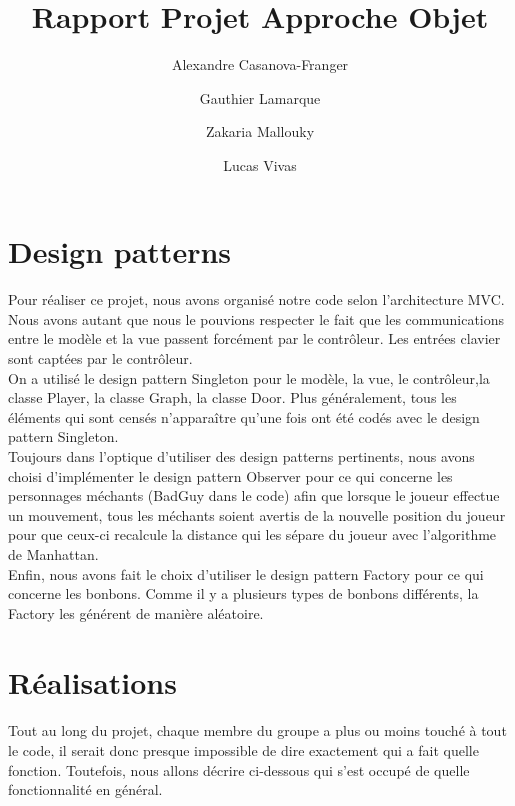 \documentclass{article}
\title{Rapport Projet Approche Objet}
\author{Alexandre Casanova-Franger\\
        \and
        Gauthier Lamarque\\
        \and
        Zakaria Mallouky\\
        \and
        Lucas Vivas\\
        }
\begin{document}
  \maketitle
  \section{Design patterns}
  \paragraph{}
  Pour réaliser ce projet, nous avons organisé notre code selon l'architecture
  MVC. Nous avons autant que nous le pouvions respecter le fait que les
  communications entre le modèle et la vue passent forcément par le contrôleur.
  Les entrées clavier sont captées par le contrôleur.\\
  On a utilisé le design pattern Singleton pour le modèle, la vue, le
  contrôleur,la classe Player, la classe Graph, la classe Door. Plus
  généralement, tous les éléments qui sont censés n'apparaître qu'une fois ont
  été codés avec le design pattern Singleton.\\
  Toujours dans l'optique d'utiliser des design patterns pertinents, nous avons
  choisi d'implémenter le design pattern Observer pour ce qui concerne les
  personnages méchants (BadGuy dans le code) afin que lorsque le joueur effectue
  un mouvement, tous les méchants soient avertis de la nouvelle position du
  joueur pour que ceux-ci recalcule la distance qui les sépare du joueur avec
  l'algorithme de Manhattan.\\
  Enfin, nous avons fait le choix d'utiliser le design pattern Factory pour ce
  qui concerne les bonbons. Comme il y a plusieurs types de bonbons différents,
  la Factory les générent de manière aléatoire.

  \section{Réalisations}
  \paragraph{}
  Tout au long du projet, chaque membre du groupe a plus ou moins touché à tout
  le code, il serait donc presque impossible de dire exactement qui a fait
  quelle fonction. Toutefois, nous allons décrire ci-dessous qui s'est occupé
  de quelle fonctionnalité en général.
\end{document}
